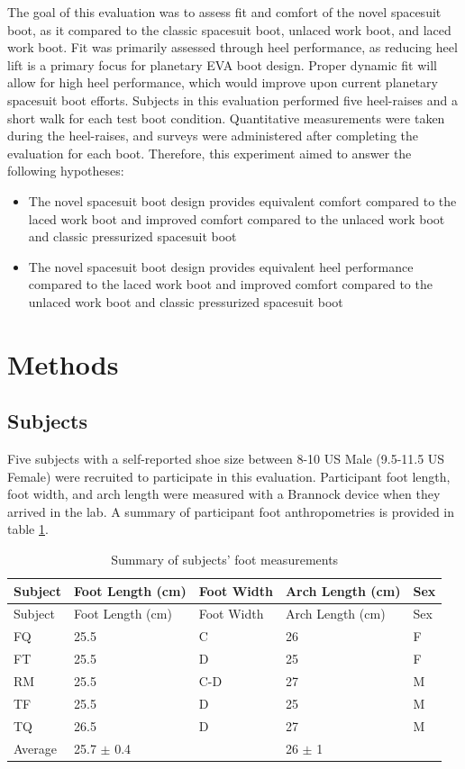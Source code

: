 \documentclass[defaultstyle,11pt]{comps}
\providecommand{\tightlist}{%
  \setlength{\itemsep}{0pt}\setlength{\parskip}{0pt}}
\begin{document}
The goal of this evaluation was to assess fit and comfort of the novel spacesuit boot, as it compared to the classic spacesuit boot, unlaced work boot, and laced work boot.
Fit was primarily assessed through heel performance, as reducing heel lift is a primary focus for planetary EVA boot design.
Proper dynamic fit will allow for high heel performance, which would improve upon current planetary spacesuit boot efforts.
Subjects in this evaluation performed five heel-raises and a short walk for each test boot condition.
Quantitative measurements were taken during the heel-raises, and surveys were administered after completing the evaluation for each boot.
Therefore, this experiment aimed to answer the following hypotheses:

\begin{itemize}
\tightlist
\item
  The novel spacesuit boot design provides equivalent comfort compared to the laced work boot and improved comfort compared to the unlaced work boot and classic pressurized spacesuit boot
\item
  The novel spacesuit boot design provides equivalent heel performance compared to the laced work boot and improved comfort compared to the unlaced work boot and classic pressurized spacesuit boot
\end{itemize}

\hypertarget{methods-3}{%
\section{Methods}\label{methods-3}}

\hypertarget{subjects-1}{%
\subsection{Subjects}\label{subjects-1}}

Five subjects with a self-reported shoe size between 8-10 US Male (9.5-11.5 US Female) were recruited to participate in this evaluation.
Participant foot length, foot width, and arch length were measured with a Brannock device when they arrived in the lab.
A summary of participant foot anthropometries is provided in table \ref{tbl:foot_meas}.

\hypertarget{tbl:foot_meas}{}
\begin{longtable}[]{@{}lllll@{}}
\caption{\label{tbl:foot_meas}Summary of subjects' foot measurements}\tabularnewline
\toprule
Subject & Foot Length (cm) & Foot Width & Arch Length (cm) & Sex \\
\midrule
\endfirsthead
\toprule
Subject & Foot Length (cm) & Foot Width & Arch Length (cm) & Sex \\
\midrule
\endhead
FQ & 25.5 & C & 26 & F \\
FT & 25.5 & D & 25 & F \\
RM & 25.5 & C-D & 27 & M \\
TF & 25.5 & D & 25 & M \\
TQ & 26.5 & D & 27 & M \\
Average & 25.7 \(\pm\) 0.4 & & 26 \(\pm\) 1 & \\
\bottomrule
\end{longtable}
\end{document}
